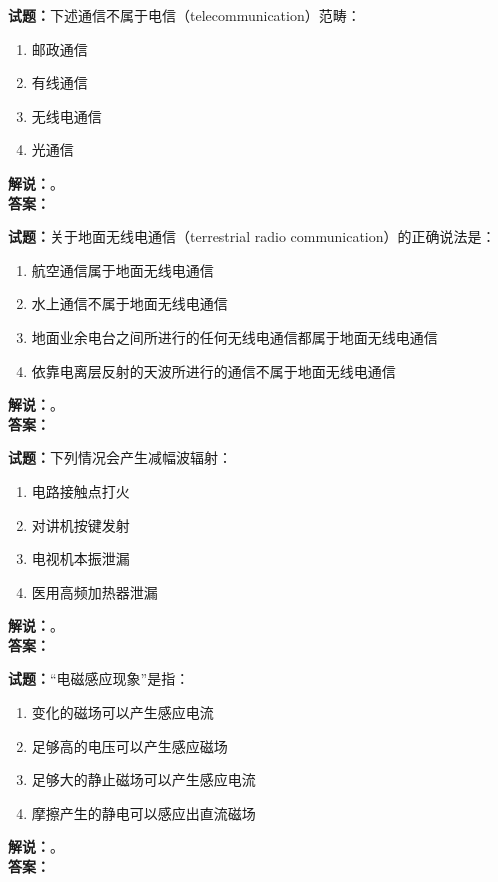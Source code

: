 \documentclass{ctexbook}
\begin{document}
\vspace{\baselineskip}

\noindent\textbf{试题：}下述通信不属于电信（telecommunication）范畴：
\begin{enumerate}[leftmargin=3em]
  \item 邮政通信
  \item 有线通信
  \item 无线电通信
  \item 光通信
\end{enumerate}
\noindent\textbf{解说：}\textbf{}。\\\noindent\textbf{答案：}

\vspace{\baselineskip}

\noindent\textbf{试题：}关于地面无线电通信（terrestrial radio communication）的正确说法是：
\begin{enumerate}[leftmargin=3em]
  \item 航空通信属于地面无线电通信
  \item 水上通信不属于地面无线电通信
  \item 地面业余电台之间所进行的任何无线电通信都属于地面无线电通信
  \item 依靠电离层反射的天波所进行的通信不属于地面无线电通信
\end{enumerate}
\noindent\textbf{解说：}\textbf{}。\\\noindent\textbf{答案：}

\vspace{\baselineskip}

\noindent\textbf{试题：}下列情况会产生减幅波辐射：
\begin{enumerate}[leftmargin=3em]
  \item 电路接触点打火
  \item 对讲机按键发射
  \item 电视机本振泄漏
  \item 医用高频加热器泄漏
\end{enumerate}
\noindent\textbf{解说：}\textbf{}。\\\noindent\textbf{答案：}

\vspace{\baselineskip}

\noindent\textbf{试题：}“电磁感应现象”是指：
\begin{enumerate}[leftmargin=3em]
  \item 变化的磁场可以产生感应电流
  \item 足够高的电压可以产生感应磁场
  \item 足够大的静止磁场可以产生感应电流
  \item 摩擦产生的静电可以感应出直流磁场
\end{enumerate}
\noindent\textbf{解说：}\textbf{}。\\\noindent\textbf{答案：}
\end{document}
